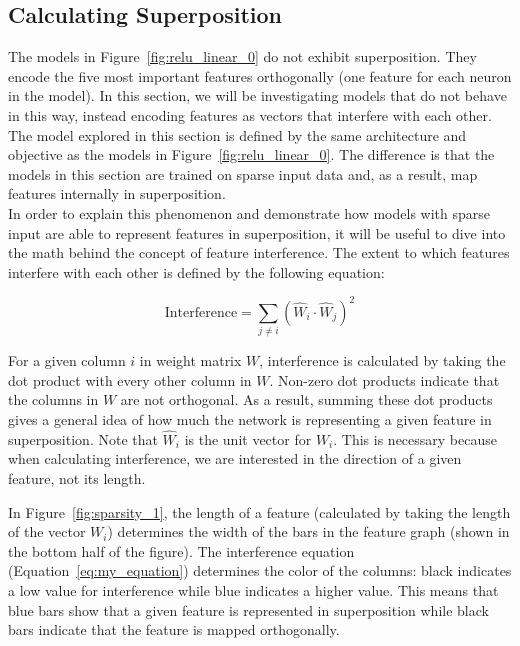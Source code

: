\documentclass{article} %
\begin{document}
\subsection{Calculating Superposition}
\label{sec:calc_super}

The models in Figure~\ref{fig:relu_linear_0} do not exhibit superposition. They
encode the five most important features orthogonally (one feature for each
neuron in the model). In this section, we will be investigating models
that do not behave in this way, instead encoding features as vectors that interfere
with each other. The model explored in this section is defined by the same architecture
and objective as the models in Figure~\ref{fig:relu_linear_0}. The difference
is that the models in this section are trained on sparse input data and, as a
result, map features internally in superposition. \\

In order to explain this phenomenon and demonstrate how models with sparse input
are able to represent features in superposition, it will be useful to dive into 
the math behind the concept of feature interference. The extent to which 
features interfere with each other is defined by the following equation:

\begin{equation}
\label{eq:my_equation}
\text{Interference} = \sum_{j \neq i} (\hat{W}_i \cdot \hat{W}_j)^2
\end{equation}

For a given column $i$ in weight matrix $W$, interference is calculated by taking
the dot product with every other column in $W$. Non-zero dot products indicate
that the columns in $W$ are not orthogonal. As a result, summing these dot 
products gives a general idea of how much the network is representing a given
feature in superposition. Note that $\hat{W}_i$ is the unit vector for $W_i$. 
This is necessary because when calculating interference, we are interested in
the direction of a given feature, not its length.\newline

In Figure~\ref{fig:sparsity_1}, the length of a feature (calculated by taking the
length of the vector $W_i$) determines the width of the bars in the feature
graph (shown in the bottom half of the figure). The interference equation (Equation~\ref{eq:my_equation}) determines the
color of the columns: black indicates a low value for interference
while blue indicates a higher value. This means that blue bars show that a given feature is represented
in superposition while black bars indicate that the feature is mapped orthogonally.
    
\end{document}
